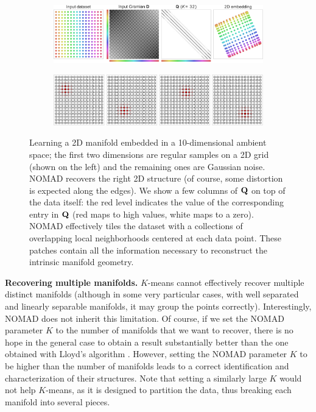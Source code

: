 \documentclass[twoside,11pt]{article}
\begin{document}
\begin{figure}[t]
	\centering
	\begin{subfigure}[b]{.8\textwidth}
		\centering
		\includegraphics[width=\linewidth]{embedding/square}
		
		\caption{}
		\label{fig:square_embedding}
	\end{subfigure}
	\begin{subfigure}[b]{.8\textwidth}
		\centering
        \includegraphics[width=\linewidth]{embedding/square_plot_Q_on_data_composite}
		
		\caption{}
		\label{fig:square_Q_on_data}
	\end{subfigure}
	
	\caption{Learning a 2D manifold embedded in a 10-dimensional ambient space; the first two dimensions are regular samples on a 2D grid (shown on the left) and the remaining ones are Gaussian noise. \protect{} NOMAD recovers the right 2D structure (of course, some distortion is expected along the edges).
	\protect{} We show a few columns of ${\mathbf{Q}}$ on top of the data itself: the red level indicates the value of the corresponding entry in ${\mathbf{Q}}$ (red maps to high values, white maps to a zero).
	NOMAD effectively tiles the dataset with a collections of overlapping local neighborhoods centered at each data point. These patches contain all the information necessary to reconstruct the intrinsic manifold geometry. 
	}
	\label{fig:square}
\end{figure}

\noindent\textbf{Recovering multiple manifolds.}
$K$-means cannot effectively recover multiple distinct manifolds (although in some very particular cases, with well separated and linearly separable manifolds, it may group the points correctly). Interestingly, NOMAD does not inherit this limitation. Of course, if we set the NOMAD parameter $K$ to the number of manifolds that we want to recover, there is no hope in the general case to obtain a result substantially better than the one obtained with Lloyd's algorithm \citep{Lloyd1982}. However, setting the NOMAD parameter $K$ to be higher than the number of manifolds leads to a correct identification and characterization of their structures.  Note that setting a similarly large $K$ would not help $K$-means, as it is designed to partition the data, thus breaking each manifold into several pieces.
\end{document}

